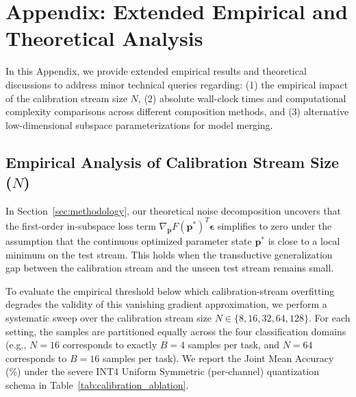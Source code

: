 \documentclass{article}
\theoremstyle{plain}
\theoremstyle{definition}
\theoremstyle{remark}
\begin{document}
\section{Appendix: Extended Empirical and Theoretical Analysis}
\label{sec:appendix}

In this Appendix, we provide extended empirical results and theoretical discussions to address minor technical queries regarding: (1) the empirical impact of the calibration stream size $N$, (2) absolute wall-clock times and computational complexity comparisons across different composition methods, and (3) alternative low-dimensional subspace parameterizations for model merging.

\subsection{Empirical Analysis of Calibration Stream Size ($N$)}
In Section~\ref{sec:methodology}, our theoretical noise decomposition uncovers that the first-order in-subspace loss term $\nabla_{\mathbf{p}} F(\mathbf{p}^*)^T \boldsymbol{\epsilon}$ simplifies to zero under the assumption that the continuous optimized parameter state $\mathbf{p}^*$ is close to a local minimum on the test stream. This holds when the transductive generalization gap between the calibration stream and the unseen test stream remains small. 

To evaluate the empirical threshold below which calibration-stream overfitting degrades the validity of this vanishing gradient approximation, we perform a systematic sweep over the calibration stream size $N \in \{8, 16, 32, 64, 128\}$. For each setting, the samples are partitioned equally across the four classification domains (e.g., $N=16$ corresponds to exactly $B=4$ samples per task, and $N=64$ corresponds to $B=16$ samples per task). We report the Joint Mean Accuracy (\%) under the severe INT4 Uniform Symmetric (per-channel) quantization schema in Table~\ref{tab:calibration_ablation}.
\end{document}
